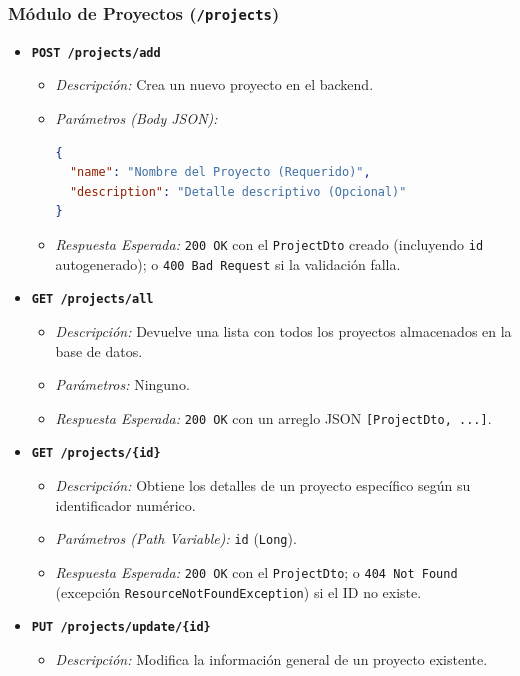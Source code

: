 \documentclass[12pt,a4paper]{article}
\begin{document}
\subsubsection{Módulo de Proyectos (\texttt{/projects})}
\begin{itemize}
    \item \textbf{\texttt{POST /projects/add}}
    \begin{itemize}
        \item \textit{Descripción:} Crea un nuevo proyecto en el backend.
        \item \textit{Parámetros (Body JSON):}
\begin{lstlisting}[language=json]
{
  "name": "Nombre del Proyecto (Requerido)",
  "description": "Detalle descriptivo (Opcional)"
}
\end{lstlisting}
        \item \textit{Respuesta Esperada:} \texttt{200 OK} con el \texttt{ProjectDto} creado (incluyendo \texttt{id} autogenerado); o \texttt{400 Bad Request} si la validación falla.
    \end{itemize}
    \item \textbf{\texttt{GET /projects/all}}
    \begin{itemize}
        \item \textit{Descripción:} Devuelve una lista con todos los proyectos almacenados en la base de datos.
        \item \textit{Parámetros:} Ninguno.
        \item \textit{Respuesta Esperada:} \texttt{200 OK} con un arreglo JSON \texttt{[ProjectDto, ...]}.
    \end{itemize}
    \item \textbf{\texttt{GET /projects/\{id\}}}
    \begin{itemize}
        \item \textit{Descripción:} Obtiene los detalles de un proyecto específico según su identificador numérico.
        \item \textit{Parámetros (Path Variable):} \texttt{id} (\texttt{Long}).
        \item \textit{Respuesta Esperada:} \texttt{200 OK} con el \texttt{ProjectDto}; o \texttt{404 Not Found} (excepción \texttt{ResourceNotFoundException}) si el ID no existe.
    \end{itemize}
    \item \textbf{\texttt{PUT /projects/update/\{id\}}}
    \begin{itemize}
        \item \textit{Descripción:} Modifica la información general de un proyecto existente.

\end{itemize}
\end{itemize}
\end{document}
